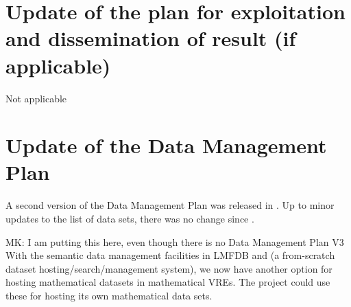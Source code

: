 
\section{Update of the plan for exploitation and dissemination of result (if
    applicable)}
 Not applicable

\section{Update of the Data Management Plan}


A second version of the Data Management Plan was released in
. Up to minor updates to the list
of data sets, there was no change since
.

\begin{newpart}{MK: I am putting this here, even though there is no Data Management Plan
    V3}
  With the semantic data management facilities in LMFDB and \dmh (a from-scratch dataset
  hosting/search/management system), we now have another option for
  hosting mathematical datasets in mathematical VREs. The \pn project could use these for
  hosting its own mathematical data sets. 
\end{newpart}


